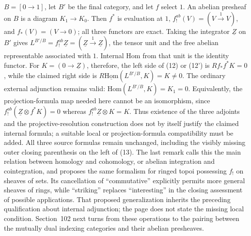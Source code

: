 $B=[0\to1]$, let $B'$ be the final category, and let $f$ select $1$. An abelian presheaf on $B$ is a diagram $K_1\to K_0$. Then $f^*$ is evaluation at $1$, $f_!^{ab}(V)=(V\xrightarrow{1}V)$, and $f_*(V)=(V\to0)$; all three functors are exact. Taking the integrator $\underline Z$ on $B'$ gives $L^{B'/B}=f_!^{ab}\underline Z=(\underline Z\xrightarrow{1}\underline Z)$, the tensor unit and the free abelian representable associated with $1$. Internal Hom from that unit is the identity functor. For $K=(0\to\underline Z)$, therefore, the left side of (12) or (12') is $Rf_*f^*K=0$, while the claimed right side is $R\underline{\mathrm{Hom}}(L^{B'/B},K)=K\ne0$. The ordinary external adjunction remains valid: $\mathrm{Hom}(L^{B'/B},K)=K_1=0$. Equivalently, the projection-formula map needed here cannot be an isomorphism, since $f_!^{ab}(\underline Z\otimes f^*K)=0$ whereas $f_!^{ab}\underline Z\otimes K=K$. Thus existence of the three adjoints and the projective-resolution construction does not by itself justify the claimed internal formula; a suitable local or projection-formula compatibility must be added. All three source formulas remain unchanged, including the visibly missing outer closing parenthesis on the left of (13). The last remark calls this the main relation between homology and cohomology, or abelian integration and cointegration, and proposes the same formalism for ringed topoi possessing $f_!$ on sheaves of sets. Its cancellation of ``commutative'' explicitly permits more general sheaves of rings, while ``striking'' replaces ``interesting'' in the closing assessment of possible applications. That proposed generalization inherits the preceding qualification about internal adjunction; the page does not state the missing local condition. Section~102 next turns from these operations to the pairing between the mutually dual indexing categories and their abelian presheaves.
